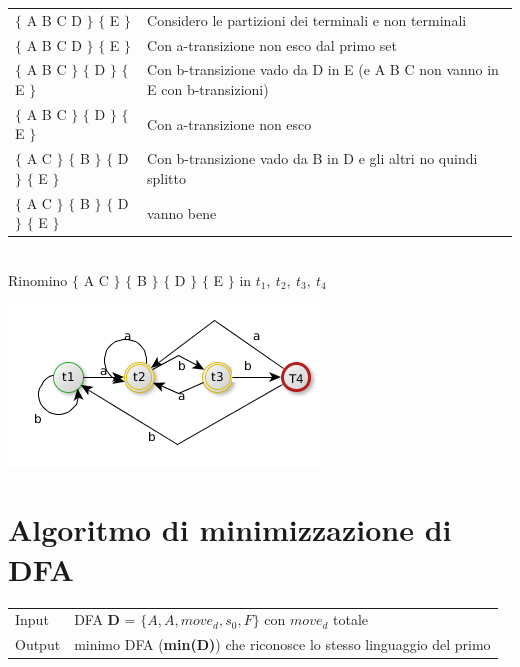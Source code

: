 \begin{tabular}{ll}
    $\{$ A B C D $\}$ $\{$ E $\}$                       & Considero le partizioni dei terminali e non terminali \\  
    $\{$ A B C D $\}$ $\{$ E $\}$                       & Con a-transizione non esco dal primo set\\  
    $\{$ A B C $\}$ $\{$ D $\}$ $\{$ E $\}$             & Con b-transizione vado da D in E (e A B C non vanno in E con b-transizioni)\\  
    $\{$ A B C $\}$ $\{$ D $\}$ $\{$ E $\}$             & Con a-transizione non esco\\    
    $\{$ A C $\}$ $\{$ B $\}$ $\{$ D $\}$ $\{$ E $\}$   & Con b-transizione vado da B in D e gli altri no quindi splitto \\
    $\{$ A C $\}$ $\{$ B $\}$ $\{$ D $\}$ $\{$ E $\}$   & vanno bene \\
\end{tabular}\\[5pt]

Rinomino  $\{$ A C $\}$ $\{$ B $\}$ $\{$ D $\}$ $\{$ E $\}$ in $t_1,\ t_2,\ t_3,\ t_4 $

\begin{center}
	\includegraphics[scale=0.5]{Chapters/Img/c02_06.png}\\
\end{center} 

\section{Algoritmo di minimizzazione di DFA}
\begin{center}
    \begin{tabular}{ll}
        Input   &   DFA \textbf{D} = $\{ A,A,move_d, s_0, F\}$ con $move_d$ totale\\
        Output  &   minimo DFA (\textbf{min(D)}) che riconosce lo stesso linguaggio del primo\\ 
    \end{tabular}
\end{center}

